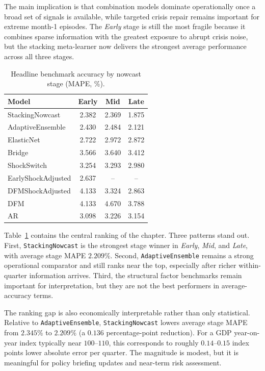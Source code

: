 \documentclass[12pt,a4paper]{article}
\begin{document}
The main implication is that combination models dominate operationally once a broad set of signals is available, while targeted crisis repair remains important for extreme month-1 episodes. The \textit{Early} stage is still the most fragile because it combines sparse information with the greatest exposure to abrupt crisis noise, but the stacking meta-learner now delivers the strongest average performance across all three stages.

\begin{table}[H]
    \centering
    \caption{Headline benchmark accuracy by nowcast stage (MAPE, \%).}
    \label{tab:headline_accuracy}
    \begin{tabular}{lccc}
        \hline
        Model & Early & Mid & Late \\
        \hline
        StackingNowcast & 2.382 & 2.369 & 1.875 \\
        AdaptiveEnsemble & 2.430 & 2.484 & 2.121 \\
        ElasticNet & 2.722 & 2.972 & 2.872 \\
        Bridge & 3.566 & 3.640 & 3.412 \\
        ShockSwitch & 3.254 & 3.293 & 2.980 \\
        EarlyShockAdjusted & 2.637 & -- & -- \\
        DFMShockAdjusted & 4.133 & 3.324 & 2.863 \\
        DFM & 4.133 & 4.670 & 3.788 \\
        AR & 3.098 & 3.226 & 3.154 \\
        \hline
    \end{tabular}
\end{table}

Table~\ref{tab:headline_accuracy} contains the central ranking of the chapter. Three patterns stand out. First, \texttt{StackingNowcast} is the strongest stage winner in \textit{Early}, \textit{Mid}, and \textit{Late}, with average stage MAPE $2.209\%$. Second, \texttt{AdaptiveEnsemble} remains a strong operational comparator and still ranks near the top, especially after richer within-quarter information arrives. Third, the structural factor benchmarks remain important for interpretation, but they are not the best performers in average-accuracy terms.

The ranking gap is also economically interpretable rather than only statistical. Relative to \texttt{AdaptiveEnsemble}, \texttt{StackingNowcast} lowers average stage MAPE from $2.345\%$ to $2.209\%$ (a $0.136$ percentage-point reduction). For a GDP year-on-year index typically near $100$--$110$, this corresponds to roughly $0.14$--$0.15$ index points lower absolute error per quarter. The magnitude is modest, but it is meaningful for policy briefing updates and near-term risk assessment.
\end{document}
